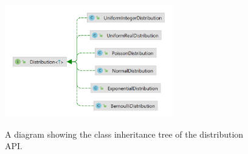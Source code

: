 \begin{figure}[!h]
    \includegraphics[width=0.65\textwidth]{images/chapter_4_implementation/distribution_api_tree}
    \centering~\caption{A diagram showing the class inheritance tree of the distribution API.}
    \label{fig:chapter_4_implementation-distribution_api_tree}
\end{figure}

